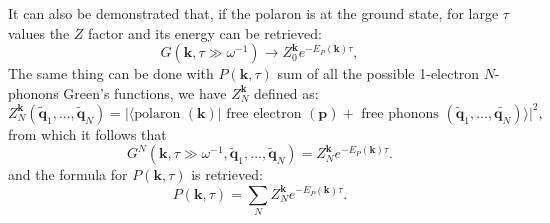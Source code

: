 It can also be demonstrated that, if the polaron is at the ground state, for large $\tau$ values the $Z$ factor and its energy can 
be retrieved:
\begin{equation}
    G(\mathbf{k},\tau\gg \omega^{-1})\xrightarrow{}Z_0^\mathbf{k}e^{-E_P(\mathbf{k})\tau},
\end{equation}
The same thing can be done with $P(\mathbf{k},\tau)$ sum of all the possible 1-electron $N$-phonons Green's functions, 
we have $Z_N^\mathbf{k}$ defined as:
\begin{equation}
    Z_N^\mathbf{k}(\tilde{\mathbf{q}}_1,...,\tilde{\mathbf{q}}_N)=|\langle \text{polaron }(\mathbf{k})|\text{ free electron }(\mathbf{p})+\text{ free phonons }(\tilde{\mathbf{q}}_1,...,\tilde{\mathbf{q}_N})\rangle|^2,
\end{equation}
from which it follows that
\begin{equation}
    G^N(\mathbf{k},\tau\gg\omega^{-1},\tilde{\mathbf{q}}_1,...,\tilde{\mathbf{q}}_N)=Z_N^\mathbf{k}e^{-E_P(\mathbf{k})\tau}.
\end{equation}
and the formula for $P(\mathbf{k},\tau)$ is retrieved:
\begin{equation}
    P(\mathbf{k},\tau)=\sum_{N}Z_N^\mathbf{k}e^{-E_P(\mathbf{k})\tau}.
\end{equation}

